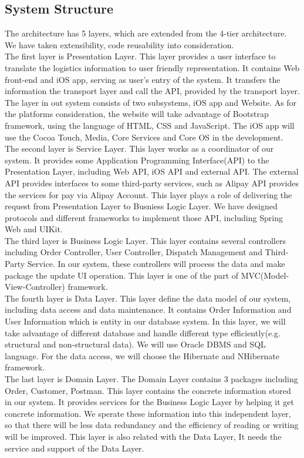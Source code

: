 \documentclass[12pt]{scrreprt}
\begin{document}
\subsection{System Structure}
The architecture has 5 layers, which are extended from the 4-tier architecture.
We have taken extensibility, code reusability into consideration.\\
The first layer is Presentation Layer. This layer provides a user interface to
translate the logistics information to user friendly representation. It contains
Web front-end and iOS app, serving as user's entry of the system. It transfers
the information the transport layer and call the API, provided by the transport
layer. The layer in out system consists of two subsystems, iOS app and Website.
As for the platforms consideration, the website will take advantage of Bootstrap
framework, using the language of HTML, CSS and JavaScript. The iOS app will use
the Cocoa Touch, Media, Core Services and Core OS in the development.\\
The second layer is Service Layer. This layer works as a coordinator of our
system. It provides some Application Programming Interface(API) to the
Presentation Layer, including Web API, iOS API and external API. The external
API provides interfaces to some third-party services, such as Alipay API
provides the services for pay via Alipay Account. This layer plays a role
of delivering the request from Presentation Layer to Busniess Logic Layer.
We have designed protocols and different frameworks to implement those API,
including Spring Web and UIKit.\\
The third layer is Business Logic Layer. This layer contains several
controllers including Order Controller, User Controller, Dispatch Management and
Third-Party Service. In our system, these controllers will process the data and
make package the update UI operation. This layer is one of the part of
MVC(Model-View-Controller) framework.\\
The fourth layer is Data Layer. This layer define the data model of our system,
including data access and data maintenance. It contains Order Information and
User Information which is entity in our database system. In this layer, we will
take advantage of different database and handle different type efficiently(e.g.
structural and non-structural data). We will use Oracle DBMS and SQL language.
For the data access, we will choose the Hibernate and NHibernate framework.\\
The last layer is Domain Layer. The Domain Layer contains 3 packages including
Order, Customer, Postman. This layer contains the concrete information stored
in our system. It provides services for the Business Logic Layer by helping it
get concrete information. We sperate these information into this independent
layer, so that there will be less data redundancy and the efficiency of reading
or writing will be improved. This layer is also related with the Data Layer, It
needs the service and support of the Data Layer.
\end{document}
